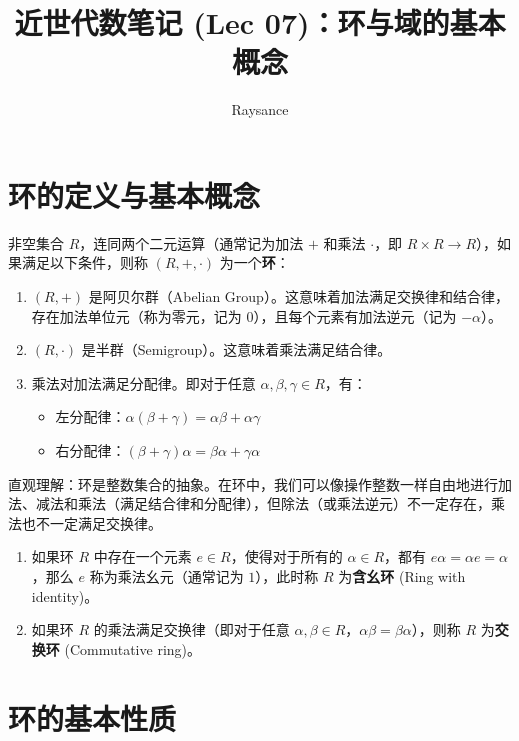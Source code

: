 \documentclass[11pt]{article}
\title{近世代数笔记 (Lec 07)：环与域的基本概念}
\author{Raysance}
\date{}
\begin{document}
\maketitle

\section{环的定义与基本概念}

\begin{cndefinition}[环 (Ring)]
非空集合 $R$，连同两个二元运算（通常记为加法 $+$ 和乘法 $\cdot$，即 $R \times R \to R$），如果满足以下条件，则称 $(R, +, \cdot)$ 为一个\textbf{环}：
\begin{enumerate}
    \item $(R, +)$ 是阿贝尔群（Abelian Group）。这意味着加法满足交换律和结合律，存在加法单位元（称为零元，记为 $0$），且每个元素有加法逆元（记为 $-\alpha$）。
    \item $(R, \cdot)$ 是半群（Semigroup）。这意味着乘法满足结合律。
    \item 乘法对加法满足分配律。即对于任意 $\alpha, \beta, \gamma \in R$，有：
    \begin{itemize}
        \item 左分配律：$\alpha(\beta + \gamma) = \alpha\beta + \alpha\gamma$
        \item 右分配律：$(\beta + \gamma)\alpha = \beta\alpha + \gamma\alpha$
    \end{itemize}
\end{enumerate}
\end{cndefinition}

直观理解：环是整数集合的抽象。在环中，我们可以像操作整数一样自由地进行加法、减法和乘法（满足结合律和分配律），但除法（或乘法逆元）不一定存在，乘法也不一定满足交换律。

\begin{cndefinition}[含幺环与交换环]
\begin{enumerate}
    \item 如果环 $R$ 中存在一个元素 $e \in R$，使得对于所有的 $\alpha \in R$，都有 $e\alpha = \alpha e = \alpha$，那么 $e$ 称为乘法幺元（通常记为 $1$），此时称 $R$ 为\textbf{含幺环} (Ring with identity)。
    \item 如果环 $R$ 的乘法满足交换律（即对于任意 $\alpha, \beta \in R$，$\alpha\beta = \beta\alpha$），则称 $R$ 为\textbf{交换环} (Commutative ring)。
\end{enumerate}
\end{cndefinition}

\section{环的基本性质}
\end{document}
